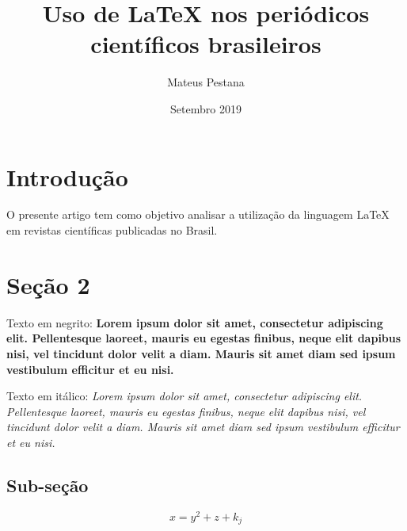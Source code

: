 \documentclass{article}
\title{Uso de \LaTeX{} nos periódicos científicos brasileiros}
\author{Mateus Pestana}
\date{Setembro 2019}
\begin{document}
\maketitle
\section{Introdução}

O presente artigo tem como objetivo analisar a utilização da linguagem \LaTeX{} em revistas científicas publicadas no Brasil.

\section{Seção 2}

Texto em negrito: \textbf{Lorem ipsum dolor sit amet, consectetur adipiscing elit. Pellentesque laoreet, mauris eu egestas finibus, neque elit dapibus nisi, vel tincidunt dolor velit a diam. Mauris sit amet diam sed ipsum vestibulum efficitur et eu nisi.}

Texto em itálico: \textit{Lorem ipsum dolor sit amet, consectetur adipiscing elit. Pellentesque laoreet, mauris eu egestas finibus, neque elit dapibus nisi, vel tincidunt dolor velit a diam. Mauris sit amet diam sed ipsum vestibulum efficitur et eu nisi.}

\subsection{Sub-seção}
$$x = y^2 + z + k_j$$
\end{document}
